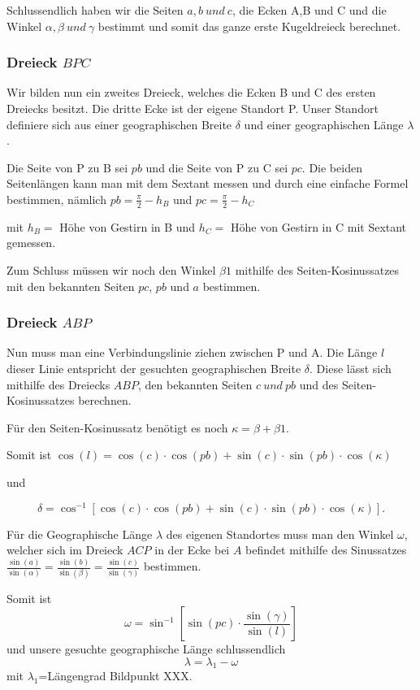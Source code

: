 Schlussendlich haben wir die Seiten $a,b\ und \ c$, die Ecken A,B und C und die Winkel $\alpha, \beta \ und \ \gamma$ bestimmt und somit das ganze erste Kugeldreieck berechnet.

\subsubsection{Dreieck $BPC$}
Wir bilden nun ein zweites Dreieck, welches die Ecken B und C des ersten Dreiecks besitzt. 
Die dritte Ecke ist der eigene Standort P.
Unser Standort definiere sich aus einer geographischen Breite $\delta$ und einer geographischen Länge $\lambda$. 

Die Seite von P zu B sei $pb$ und die Seite von P zu C sei $pc$.
Die beiden Seitenlängen kann man mit dem Sextant messen und durch eine einfache Formel bestimmen, nämlich $pb=\frac{\pi}{2} - h_{B}$ und $pc=\frac{\pi}{2} - h_{C}$ 

mit $h_B=$ Höhe von Gestirn in B und $h_C=$ Höhe von Gestirn in C mit Sextant gemessen.

Zum Schluss müssen wir noch den Winkel $\beta1$ mithilfe des Seiten-Kosinussatzes  mit den bekannten Seiten $pc$, $pb$ und $a$ bestimmen.
\subsubsection{Dreieck $ABP$}
Nun muss man eine Verbindungslinie ziehen zwischen P und A. Die Länge $l$ dieser Linie entspricht der gesuchten geographischen Breite $\delta$. Diese lässt sich mithilfe des Dreiecks $ABP$, den bekannten Seiten $c\ und \ pb$ und des Seiten-Kosinussatzes berechnen.

Für den Seiten-Kosinussatz benötigt es noch $\kappa=\beta + \beta1$.

Somit ist $\cos(l) = \cos(c)\cdot \cos(pb) + \sin(c) \cdot \sin(pb) \cdot \cos(\kappa)$

und

\[
\delta  =\cos^{-1} [\cos(c) \cdot \cos(pb) + \sin(c) \cdot \sin(pb) \cdot \cos(\kappa)].
\]

Für die Geographische Länge $\lambda$ des eigenen Standortes muss man den Winkel $\omega$, welcher sich im Dreieck $ACP$ in der Ecke bei $A$ befindet mithilfe des Sinussatzes $\frac{\sin (a)}{\sin (\alpha)} =\frac{\sin (b)}{\sin (\beta)} = \frac{\sin (c)}{\sin (\gamma)}$ bestimmen. 

Somit ist \[ \omega=\sin^{-1}[\sin(pc) \cdot \frac{\sin(\gamma)}{\sin(l)}] \]und unsere gesuchte geographische Länge schlussendlich 
\[\lambda=\lambda_1 - \omega\]
mit $\lambda_1$=Längengrad Bildpunkt XXX.
